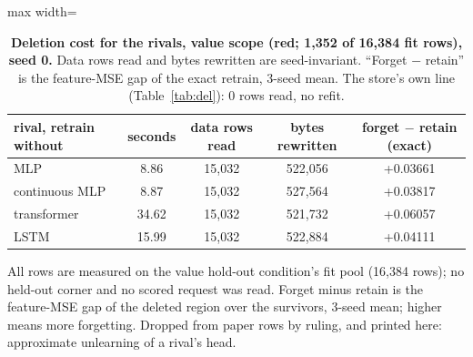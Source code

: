 \documentclass{article}
\begin{document}
\begin{table}[h]
\centering\small
\caption{\textbf{Deletion cost for the rivals, value scope (red; 1,352 of 16,384 fit rows),
seed 0.} Data rows read and bytes rewritten are seed-invariant. ``Forget $-$ retain'' is the
feature-MSE gap of the exact retrain, 3-seed mean. The store's own line (Table~\ref{tab:del}):
0 rows read, no refit.}
\label{tab:rivals-del}
\begin{adjustbox}{max width=\linewidth}\begin{tabular}{lcccc}
\toprule
rival, retrain without & seconds & data rows read & bytes rewritten & forget $-$ retain (exact) \\
\midrule
MLP & 8.86 & 15,032 & 522,056 & +0.03661 \\
continuous MLP & 8.87 & 15,032 & 527,564 & +0.03817 \\
transformer & 34.62 & 15,032 & 521,732 & +0.06057 \\
LSTM & 15.99 & 15,032 & 522,884 & +0.04111 \\
\bottomrule
\end{tabular}\end{adjustbox}
\end{table}



All rows are measured on the value hold-out condition's fit pool (16,384 rows); no held-out corner
and no scored request was read. Forget minus retain is the feature-MSE gap of the deleted region
over the survivors, 3-seed mean; higher means more forgetting. Dropped from paper rows by ruling,
and printed here: approximate unlearning of a rival's head.
\end{document}
